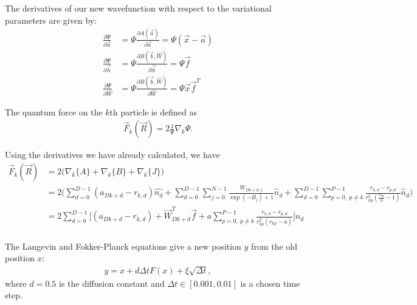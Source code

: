 \documentclass[12pt]{article}
\begin{document}
\noindent The derivatives of our new wavefunction with respect to the variational parameters are given by:
\begin{align*}
\frac{\partial \Psi}{\partial \vec{a}} &= \Psi \frac{\partial A(\vec{a})}{\partial \vec{a}} = \Psi (\vec{x}-\vec{a})\\
\frac{\partial \Psi}{\partial \vec{b}} &= \Psi \frac{\partial B(\vec{b},\hat{W})}{\partial \vec{b}} = \Psi \vec{f} \\
\frac{\partial \Psi}{\partial \hat{W}} &= \Psi \frac{\partial B(\vec{b},\hat{W})}{\partial \hat{W}}
= \Psi \vec{x} \vec{f}^T
\end{align*}


\noindent The quantum force on the $k$th particle is defined as 
\begin{align}
\vec{F}_k(\vec{R}) = 2 \frac{1}{\Psi} \nabla_k \Psi.
\end{align}

\noindent Using the derivatives we have already calculated, we have
\begin{align*}
\vec{F}_k(\vec{R}) &= 2 \Big( \nabla_k \{ A \} + \nabla_k \{ B \} +\nabla_k \{ J \} \Big)\\
&= 2 \bigg( \sum_{d=0}^{D-1} (a_{Dk+d} -r_{k,d} ) \hat{n_{d}}  
 + \sum_{d=0}^{D-1} \sum_{j=0}^{N-1}  \frac{W_{Dk+d,j}}{\exp(-B_j)+1}   \hat{n}_d  
 + \sum_{d=0}^{D-1} \sum_{p=0, \ p\neq k}^{P-1} \frac{r_{k,d}-r_{p,d}}{r_{kp}^2 \left( \frac{r_{kp}}{a} -1 \right)} \hat{n}_d
 \bigg)\\
 &= 2 \sum_{d=0}^{D-1} \bigg[  (a_{Dk+d} -r_{k,d} ) 
 + \vec{W}_{Dk+d}^T\vec{f}   
 +  a \sum_{p=0, \ p\neq k}^{P-1} \frac{r_{k,d}-r_{p,d}}{r_{kp}^2 \left( r_{kp}-a \right)} 
 \bigg]\hat{n}_d\\
\end{align*}

\noindent The Langevin and Fokker-Planck equations give a new position $y$ from the old position $x$:
\begin{align}
y = x + d\Delta tF(x) + \xi \sqrt{\Delta t},
\end{align}
where $d=0.5$ is the diffusion constant and $\Delta t \in [0.001,0.01]$ is a chosen time step. \\
\end{document}
